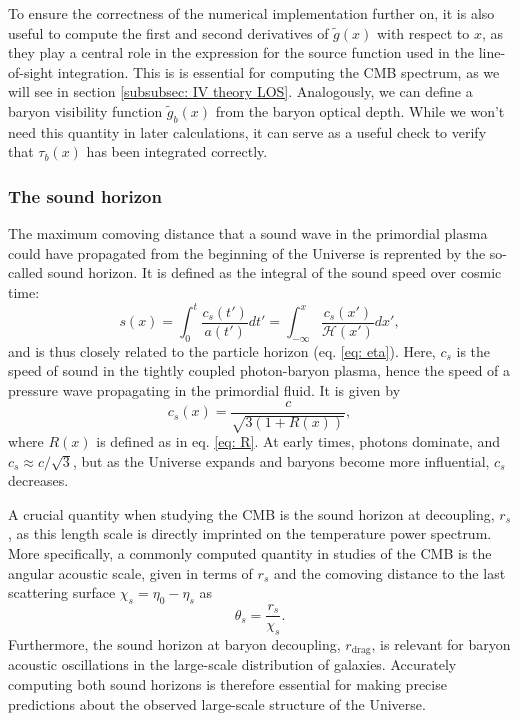 \documentclass{aa}
\numberwithin{equation}{section}
\numberwithin{table}{section}
\numberwithin{figure}{section}
\begin{document}
To ensure the correctness of the numerical implementation further on, it is also useful to compute the first and second derivatives of $\tilde{g}(x)$ with respect to $x$, as they play a central role in the expression for the source function used in the line-of-sight integration. This is is essential for computing the CMB spectrum, as we will see in section \ref{subsubsec: IV theory LOS}. Analogously, we can define a baryon visibility function $\tilde{g}_b(x)$ from the baryon optical depth. While we won't need this quantity in later calculations, it can serve as a useful check to verify that $\tau_b(x)$ has been integrated correctly.



\subsubsection{The sound horizon}\label{subsubsec: II theory sound}
The maximum comoving distance that a sound wave in the primordial plasma could have propagated from the beginning of the Universe is reprented by the so-called sound horizon. It is defined as the integral of the sound speed over cosmic time:
\begin{equation}
s(x) = \int_0^t \frac{c_s(t')}{a(t')} dt' = \int_{-\infty}^x \frac{c_s(x')}{\mathcal{H}(x')} dx',
\end{equation}
and is thus closely related to the particle horizon (eq. \eqref{eq: eta}). Here, $c_s$ is the speed of sound in the tightly coupled photon-baryon plasma, hence the speed of a pressure wave propagating in the primordial fluid. It is given by
\begin{equation}
c_s(x) = \frac{c}{\sqrt{3(1 + R(x))}},
\end{equation}
where $R(x)$ is defined as in eq. \eqref{eq: R}. At early times, photons dominate, and $c_s \approx c/\sqrt{3}$, but as the Universe expands and baryons become more influential, $c_s$ decreases.

A crucial quantity when studying the CMB is the sound horizon at decoupling, $r_s$, as this length scale is directly imprinted on the temperature power spectrum. More specifically, a commonly computed quantity in studies of the CMB is the angular acoustic scale, given in terms of $r_s$ and the comoving distance to the last scattering surface $\chi_s=\eta_0-\eta_s$ as
\begin{equation}
  \theta_s = \frac{r_s}{\chi_s}.
\end{equation}
Furthermore, the sound horizon at baryon decoupling, $r_\text{drag}$, is relevant for baryon acoustic oscillations in the large-scale distribution of galaxies. Accurately computing both sound horizons is therefore essential for making precise predictions about the observed large-scale structure of the Universe.
\end{document}
